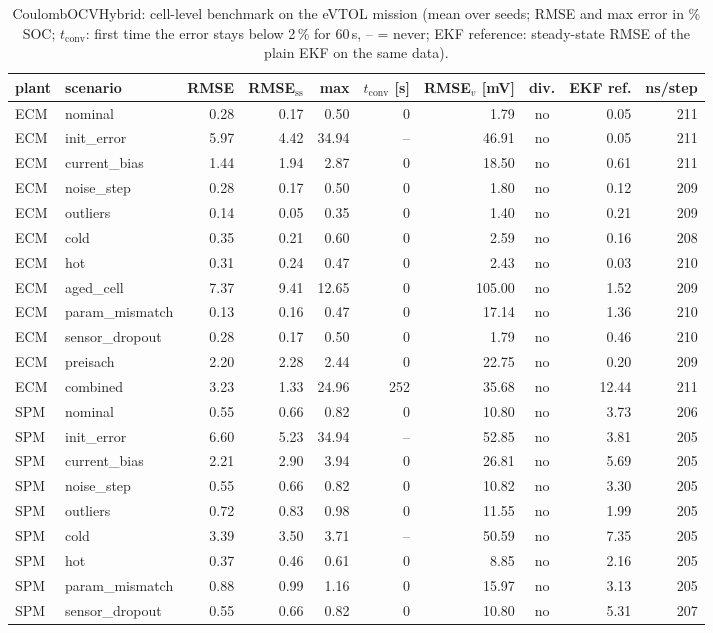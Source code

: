 \begin{table}[H]\centering\footnotesize\setlength{\tabcolsep}{4pt}
\caption{CoulombOCVHybrid: cell-level benchmark on the eVTOL mission (mean over seeds; RMSE and max error in \% SOC; $t_\mathrm{conv}$: first time the error stays below 2\,\% for 60\,s, -- = never; EKF reference: steady-state RMSE of the plain EKF on the same data).}\label{tab:cell_CoulombOCVHybrid}
\begin{tabular}{llrrrrrcrr}\toprule
plant & scenario & RMSE & RMSE$_\mathrm{ss}$ & max & $t_\mathrm{conv}$ [s] & RMSE$_v$ [mV] & div. & EKF ref. & ns/step \\ \midrule
ECM & nominal & 0.28 & 0.17 & 0.50 & 0 & 1.79 & no & 0.05 & 211 \\
ECM & init\_error & 5.97 & 4.42 & 34.94 & -- & 46.91 & no & 0.05 & 211 \\
ECM & current\_bias & 1.44 & 1.94 & 2.87 & 0 & 18.50 & no & 0.61 & 211 \\
ECM & noise\_step & 0.28 & 0.17 & 0.50 & 0 & 1.80 & no & 0.12 & 209 \\
ECM & outliers & 0.14 & 0.05 & 0.35 & 0 & 1.40 & no & 0.21 & 209 \\
ECM & cold & 0.35 & 0.21 & 0.60 & 0 & 2.59 & no & 0.16 & 208 \\
ECM & hot & 0.31 & 0.24 & 0.47 & 0 & 2.43 & no & 0.03 & 210 \\
ECM & aged\_cell & 7.37 & 9.41 & 12.65 & 0 & 105.00 & no & 1.52 & 209 \\
ECM & param\_mismatch & 0.13 & 0.16 & 0.47 & 0 & 17.14 & no & 1.36 & 210 \\
ECM & sensor\_dropout & 0.28 & 0.17 & 0.50 & 0 & 1.79 & no & 0.46 & 210 \\
ECM & preisach & 2.20 & 2.28 & 2.44 & 0 & 22.75 & no & 0.20 & 209 \\
ECM & combined & 3.23 & 1.33 & 24.96 & 252 & 35.68 & no & 12.44 & 211 \\
\midrule
SPM & nominal & 0.55 & 0.66 & 0.82 & 0 & 10.80 & no & 3.73 & 206 \\
SPM & init\_error & 6.60 & 5.23 & 34.94 & -- & 52.85 & no & 3.81 & 205 \\
SPM & current\_bias & 2.21 & 2.90 & 3.94 & 0 & 26.81 & no & 5.69 & 205 \\
SPM & noise\_step & 0.55 & 0.66 & 0.82 & 0 & 10.82 & no & 3.30 & 205 \\
SPM & outliers & 0.72 & 0.83 & 0.98 & 0 & 11.55 & no & 1.99 & 205 \\
SPM & cold & 3.39 & 3.50 & 3.71 & -- & 50.59 & no & 7.35 & 205 \\
SPM & hot & 0.37 & 0.46 & 0.61 & 0 & 8.85 & no & 2.16 & 205 \\
SPM & param\_mismatch & 0.88 & 0.99 & 1.16 & 0 & 15.97 & no & 3.13 & 205 \\
SPM & sensor\_dropout & 0.55 & 0.66 & 0.82 & 0 & 10.80 & no & 5.31 & 207 \\
\bottomrule\end{tabular}\end{table}
